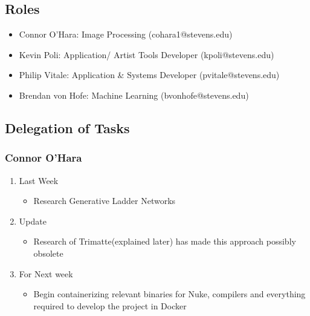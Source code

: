 \documentclass[15pt]{article}
\begin{document}
\subsection{Roles}
\label{sec:orgbfa8ebf}
\begin{itemize}
\item Connor O’Hara: Image Processing (cohara1@stevens.edu)
\item Kevin Poli: Application/ Artist Tools Developer (kpoli@stevens.edu)
\item Philip Vitale: Application \& Systems Developer (pvitale@stevens.edu)
\item Brendan von Hofe: Machine Learning (bvonhofe@stevens.edu)
\end{itemize}



\subsection{Delegation of Tasks}
\label{sec:orgf1da5b0}

\subsubsection{Connor O’Hara}
\label{sec:orga28108c}
\begin{enumerate}
\item Last Week
\label{sec:orgac17977}
\begin{itemize}
\item Research Generative Ladder Networks
\end{itemize}
\item Update
\label{sec:orgb665fea}
\begin{itemize}
\item Research of Trimatte(explained later) has made this approach possibly obsolete
\end{itemize}
\item For Next week
\label{sec:org4a5e17a}
\begin{itemize}
\item Begin containerizing relevant binaries for Nuke, compilers and everything required
to develop the project in Docker
\end{itemize}
\end{enumerate}
\end{document}
